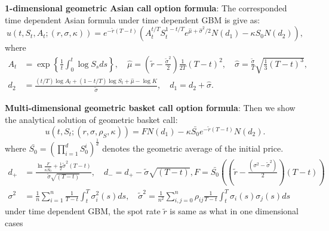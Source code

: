 \documentclass[11pt,a4paper]{article}
\theoremstyle{remark}
\begin{document}
	\noindent \textbf{1-dimensional geometric Asian call option formula}: The corresponded time dependent Asian formula under time dependent GBM is give as:
	\begin{equation*}
		u\left(t, S_t, A_t; (r, \sigma, \kappa)\right)=e^{-\tilde{r}(T-t)}\left(A_t^{t / T} S_t^{1-t / T} e^{\hat{\mu}+\hat{\sigma}^2 / 2} N\left(d_1\right)-\kappa S_0 N\left(d_2\right)\right),
	\end{equation*}
	where
	\begin{align}
		A_t & =\exp \left\{\frac{1}{t} \int_0^t \log S_s d s\right\}  , \quad \hat{\mu}  =\left(\tilde{r}-\frac{\tilde{\sigma}^2}{2}\right) \frac{1}{2 T}(T-t)^2  , \quad \hat{\sigma}=\frac{\tilde{\sigma}}{T} \sqrt{\frac{1}{3}(T-t)^3}, \\
		d_2 & =\frac{(t / T) \log A_t+(1-t / T) \log S_t+\hat{\mu}-\log K}{\tilde{\sigma}}  , \quad d_1 =d_2+\hat{\sigma} .
	\end{align}
	
	
	
	\noindent \textbf{Multi-dimensional geometric basket call option formula}: Then we show the analytical solution of geometric basket call:
	\begin{equation*}
		u\left(t, S_t ; (r, \sigma, \rho_S, \kappa)\right)=F N\left(d_1\right) - \kappa \bar{S_0} e^{-\tilde{r} (T-t)}N\left(d_2\right).
	\end{equation*}
	where $\bar{S_0} = \left( \prod_{i=1}^d S^i_0\right)^{\frac{1}{d}}$ denotes the geometric average of the initial price. 
	\begin{align} 
		d_{+} &=\frac{\ln \frac{F}{\kappa \bar{S_0}}+\frac{1}{2} \tilde{\sigma}^2 (T-t)}{\tilde{\sigma} \sqrt{(T-t)}} , \quad d_{-}=d_{+}-\tilde{\sigma} \sqrt{(T-t)}, F =\bar{S_0} \left(\left(\tilde{r}-\frac{\left(\sigma^2-\tilde{\sigma}^2\right)}{2}\right) (T-t)\right)  \\
		\sigma^2 &=\frac{1}{n} \sum_{i=1}^n \frac{1}{T-t}\int_t^T\sigma_i^2(s) ds , \quad \tilde{\sigma}^2 =\frac{1}{n^2} \sum_{i, j=0}^n \rho_{i j} \frac{1}{T-t}\int_t^T\sigma_i(s)\sigma_j(s) ds       
	\end{align}	
	under time dependent GBM, the spot rate $\tilde{r}$ is same as what in one dimensional cases
	
	
	
	
	
	
	
	
	
\end{document}
